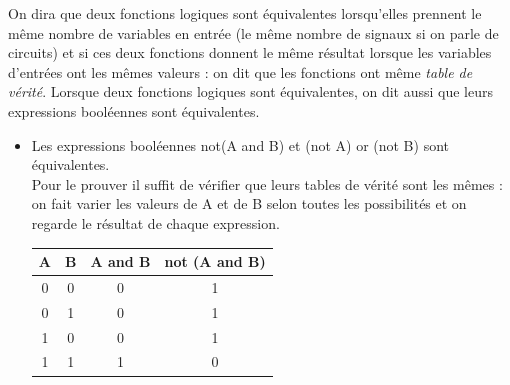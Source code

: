 \begin{definition}
    On dira que deux fonctions logiques sont équivalentes lorsqu'elles prennent le même nombre de variables en entrée (le même nombre de signaux si on parle de circuits) et si ces deux fonctions donnent le même résultat lorsque les variables d'entrées ont les mêmes valeurs : on dit que les fonctions ont même \textit{table de vérité}.
    Lorsque deux fonctions logiques sont équivalentes, on dit aussi que leurs expressions booléennes sont équivalentes.
\end{definition}

\begin{exemple}[s]
    \begin{itemize}
        \item 		Les expressions booléennes not(A and B) et (not A) or (not B) sont équivalentes.\\
              Pour le prouver il suffit de vérifier que leurs tables de vérité sont les mêmes : on fait varier les valeurs de A et de B selon toutes les possibilités et on regarde le résultat de chaque expression.
              \begin{center}
                  \begin{tabular}{|c|c|c|c|}
                      \hline\rowcolor{UGLiOrange}
                      {\boxfont\color{white}
                      A} & {\boxfont\color{white}B} & {\boxfont\color{white}A and B} & {\boxfont\color{white}not (A and B)} \\
                      \hline
                      0  & 0                        & 0                              & \cellcolor{UGLiOrange!25}	1          \\
                      \hline
                      0  & 1                        & 0                              & \cellcolor{UGLiOrange!25}	1          \\
                      \hline
                      1  & 0                        & 0                              & \cellcolor{UGLiOrange!25}	1          \\
                      \hline
                      1  & 1                        & 1                              & \cellcolor{UGLiOrange!25}	0          \\
                      \hline
                  \end{tabular}\\[2em]


\end{center}
\end{itemize}
\end{exemple}
